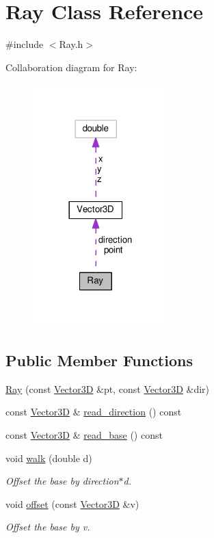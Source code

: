 \hypertarget{classRay}{}\section{Ray Class Reference}
\label{classRay}


{\ttfamily \#include $<$Ray.\+h$>$}



Collaboration diagram for Ray\+:\nopagebreak
\begin{figure}[H]
\begin{center}
\leavevmode
\includegraphics[width=149pt]{classRay__coll__graph}
\end{center}
\end{figure}
\subsection*{Public Member Functions}
\begin{DoxyCompactItemize}
\item 
\hyperlink{classRay_a9fad894cf932e40e035eb93ed880577b}{Ray} (const \hyperlink{classVector3D}{Vector3D} \&pt, const \hyperlink{classVector3D}{Vector3D} \&dir)
\item 
const \hyperlink{classVector3D}{Vector3D} \& \hyperlink{classRay_ae18a3d51cd5b0a57bd47a0a1f79e7d2d}{read\+\_\+direction} () const 
\item 
const \hyperlink{classVector3D}{Vector3D} \& \hyperlink{classRay_a07aaea95760db6dcc39f87308d9470a1}{read\+\_\+base} () const 
\item 
void \hyperlink{classRay_af986618fceed92c3c189f8950deb6d21}{walk} (double d)
\begin{DoxyCompactList}\small\item\em Offset the base by direction$\ast$d. \end{DoxyCompactList}\item 
void \hyperlink{classRay_ab5669d08ac75473d52cb4e0ade79b6c1}{offset} (const \hyperlink{classVector3D}{Vector3D} \&v)
\begin{DoxyCompactList}\small\item\em Offset the base by v. \end{DoxyCompactList}\end{DoxyCompactItemize}
